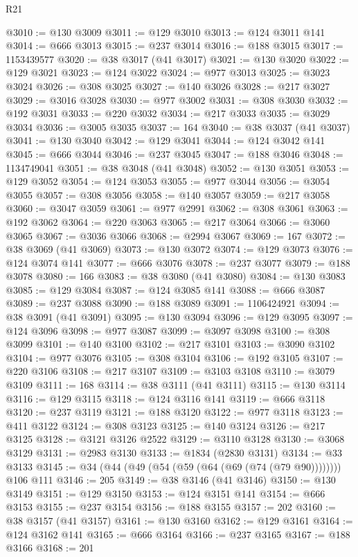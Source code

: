 \begin{lexlean}{R21}
\begin{coremodule}
@3010 := @130 @3009
@3011 := @129 @3010
@3013 := @124 @3011 @141
@3014 := @666 @3013
@3015 := @237 @3014
@3016 := @188 @3015
@3017 := 1153439577
@3020 := @38 @3017 (@41 @3017)
@3021 := @130 @3020
@3022 := @129 @3021
@3023 := @124 @3022
@3024 := @977 @3013
@3025 := @3023 @3024
@3026 := @308 @3025
@3027 := @140 @3026
@3028 := @217 @3027
@3029 := @3016 @3028
@3030 := @977 @3002
@3031 := @308 @3030
@3032 := @192 @3031
@3033 := @220 @3032
@3034 := @217 @3033
@3035 := @3029 @3034
@3036 := @3005 @3035
@3037 := 164
@3040 := @38 @3037 (@41 @3037)
@3041 := @130 @3040
@3042 := @129 @3041
@3044 := @124 @3042 @141
@3045 := @666 @3044
@3046 := @237 @3045
@3047 := @188 @3046
@3048 := 1134749041
@3051 := @38 @3048 (@41 @3048)
@3052 := @130 @3051
@3053 := @129 @3052
@3054 := @124 @3053
@3055 := @977 @3044
@3056 := @3054 @3055
@3057 := @308 @3056
@3058 := @140 @3057
@3059 := @217 @3058
@3060 := @3047 @3059
@3061 := @977 @2991
@3062 := @308 @3061
@3063 := @192 @3062
@3064 := @220 @3063
@3065 := @217 @3064
@3066 := @3060 @3065
@3067 := @3036 @3066
@3068 := @2994 @3067
@3069 := 167
@3072 := @38 @3069 (@41 @3069)
@3073 := @130 @3072
@3074 := @129 @3073
@3076 := @124 @3074 @141
@3077 := @666 @3076
@3078 := @237 @3077
@3079 := @188 @3078
@3080 := 166
@3083 := @38 @3080 (@41 @3080)
@3084 := @130 @3083
@3085 := @129 @3084
@3087 := @124 @3085 @141
@3088 := @666 @3087
@3089 := @237 @3088
@3090 := @188 @3089
@3091 := 1106424921
@3094 := @38 @3091 (@41 @3091)
@3095 := @130 @3094
@3096 := @129 @3095
@3097 := @124 @3096
@3098 := @977 @3087
@3099 := @3097 @3098
@3100 := @308 @3099
@3101 := @140 @3100
@3102 := @217 @3101
@3103 := @3090 @3102
@3104 := @977 @3076
@3105 := @308 @3104
@3106 := @192 @3105
@3107 := @220 @3106
@3108 := @217 @3107
@3109 := @3103 @3108
@3110 := @3079 @3109
@3111 := 168
@3114 := @38 @3111 (@41 @3111)
@3115 := @130 @3114
@3116 := @129 @3115
@3118 := @124 @3116 @141
@3119 := @666 @3118
@3120 := @237 @3119
@3121 := @188 @3120
@3122 := @977 @3118
@3123 := @411 @3122
@3124 := @308 @3123
@3125 := @140 @3124
@3126 := @217 @3125
@3128 := @3121 @3126 @2522
@3129 := @3110 @3128
@3130 := @3068 @3129
@3131 := @2983 @3130
@3133 := @1834 (@2830 @3131)
@3134 := @33 @3133
@3145 := @34 (@44 (@49 (@54 (@59 (@64 (@69 (@74 (@79 @90)))))))) @106 @111
@3146 := 205
@3149 := @38 @3146 (@41 @3146)
@3150 := @130 @3149
@3151 := @129 @3150
@3153 := @124 @3151 @141
@3154 := @666 @3153
@3155 := @237 @3154
@3156 := @188 @3155
@3157 := 202
@3160 := @38 @3157 (@41 @3157)
@3161 := @130 @3160
@3162 := @129 @3161
@3164 := @124 @3162 @141
@3165 := @666 @3164
@3166 := @237 @3165
@3167 := @188 @3166
@3168 := 201

\end{coremodule}
\end{lexlean}
